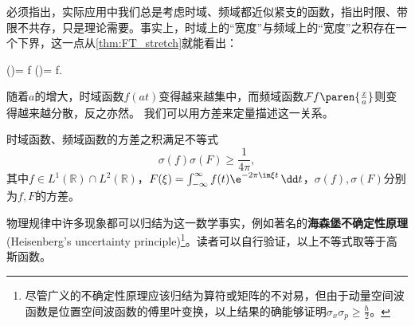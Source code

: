 必须指出，实际应用中我们总是考虑时域、频域都近似紧支的函数，指出时限、带限不共存，只是理论需要。事实上，时域上的“宽度”与频域上的“宽度”之积存在一个下界，这一点从\cref{thm:FT_stretch}就能看出：
\begin{lralign}
    (\xi)= f
\switch
    (\omega)= f.
\end{lralign}
随着$a$的增大，时域函数$f(at)$变得越来越集中，而频域函数$\mathcal{F} f\paren{\frac{x}{a}}$则变得越来越分散，反之亦然。
我们可以用方差来定量描述这一关系。
\begin{theorem}
    时域函数、频域函数的方差之积满足不等式
    \begin{equation}
        \sigma(f)\sigma(F)\geq \frac{1}{4\pi},
    \end{equation}
    其中$f\in L^1(\mathbb{R})\cap L^2(\mathbb{R})$，$F(\xi)=\int_{-\infty}^{\infty}f(t)\e^{-2\pi\im\xi t}\,\dd t$，$\sigma(f),\sigma(F)$分别为$f,F$的方差。
\end{theorem}
物理规律中许多现象都可以归结为这一数学事实，例如著名的\textbf{海森堡不确定性原理}(Heisenberg's uncertainty principle)\footnote{尽管广义的不确定性原理应该归结为算符或矩阵的不对易，但由于动量空间波函数是位置空间波函数的傅里叶变换，以上结果的确能够证明$\sigma_x \sigma_p\geq\frac{\hbar}{2}$。}。读者可以自行验证，以上不等式取等于高斯函数。
